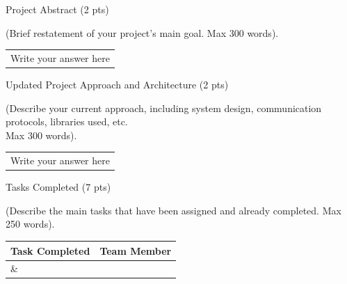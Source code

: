 \documentclass[12pt,a4paper]{article}
\newcommand{\sectiontitle}[1]{%
    {\color{GEUBlue}
    \fontsize{18}{22}\selectfont #1}
}
\newcommand{\instruction}[1]{%
    {\color{InstructionGrey}
    \fontsize{10.5}{13}\selectfont #1}
}
\newcommand{\answerbox}[2]{%
    \begin{tabularx}{\textwidth}{
        |>{\raggedright\arraybackslash}X|}
        \hline
        \parbox[t][#1][t]{\dimexpr\linewidth-12pt\relax}{
            \vspace{5pt}
            \fontsize{11}{13}\selectfont #2
        }\\
        \hline
    \end{tabularx}
}
\begin{document}
\sectiontitle{Project Abstract (2 pts)}

\vspace{0.05cm}

\instruction{
(Brief restatement of your project's main goal. Max 300 words).
}

\vspace{0.12cm}

\answerbox{3.60cm}{Write your answer here}

\vspace{0.70cm}

\sectiontitle{Updated Project Approach and Architecture (2 pts)}

\vspace{0.05cm}

\instruction{
(Describe your current approach, including system design,
communication protocols, libraries used, etc.\\
Max 300 words).
}

\vspace{0.25cm}

\answerbox{4.75cm}{Write your answer here}

\newpage


\vspace*{0.20cm}

\sectiontitle{Tasks Completed (7 pts)}

\vspace{0.05cm}

\instruction{
(Describe the main tasks that have been assigned and already completed.
Max 250 words).
}

\vspace{0.20cm}

\begin{tabularx}{\textwidth}{
|>{\raggedright\arraybackslash}X
|>{\raggedright\arraybackslash}X|
}
\hline

\textbf{Task Completed} &
\textbf{Team Member}
\\
\hline

\parbox[t][3.25cm][t]{\linewidth}{}
&
\parbox[t][3.25cm][t]{\linewidth}{}
\\
\hline

\end{tabularx}

\vspace{0.65cm}
\end{document}
